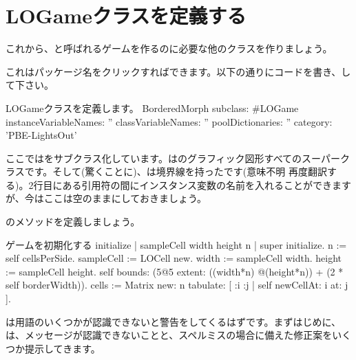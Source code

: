 \documentclass[a4paper,10pt,twoside]{book}
\begin{document}

\section{LOGameクラスを定義する}

これから、と呼ばれるゲームを作るのに必要な他のクラスを作りましょう。

これはパッケージ名をクリックすればできます。以下の通りにコードを書き、して下さい。

\begin{classdef}[sbegame]{LOGameクラスを定義します。}
BorderedMorph subclass: #LOGame
   instanceVariableNames: ''
   classVariableNames: ''
   poolDictionaries: ''
   category: 'PBE-LightsOut'
\end{classdef}

ここではをサブクラス化しています。は\pharo のグラフィック図形すべてのスーパークラスです。そして(驚くことに)、は境界線を持ったです(意味不明 再度翻訳する)。2行目にある引用符の間にインスタンス変数の名前を入れることができますが、今はここは空のままにしておきましょう。

のメソッドを定義しましょう。


\begin{numMethod}[sbegameinitialize]{ゲームを初期化する}
initialize
   | sampleCell width height n |
   super initialize.
   n := self cellsPerSide.
   sampleCell := LOCell new.
   width := sampleCell width.
   height := sampleCell height.
   self bounds: (5@5 extent: ((width*n) @(height*n)) + (2 * self borderWidth)).
   cells := Matrix new: n tabulate: [ :i :j | self newCellAt: i at: j ].
\end{numMethod}


\pharo は用語のいくつかが認識できないと警告をしてくるはずです。まずはじめに、\pharo は、メッセージが認識できないことと、スペルミスの場合に備えた修正案をいくつか提示してきます。
\end{document}
